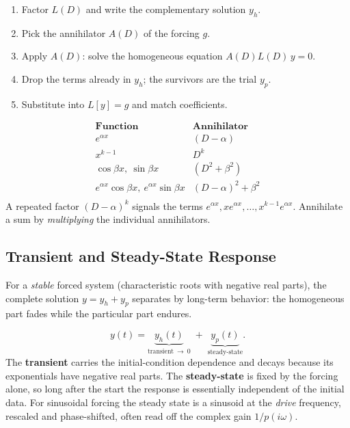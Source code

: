 \begin{methodbox}
\begin{enumerate}[leftmargin=1.6em, itemsep=2pt]
    \item Factor $L(D)$ and write the complementary solution $y_h$.
    \item Pick the annihilator $A(D)$ of the forcing $g$.
    \item Apply $A(D)$: solve the homogeneous equation $A(D)L(D)\,y = 0$.
    \item Drop the terms already in $y_h$; the survivors are the trial $y_p$.
    \item Substitute into $L[y]=g$ and match coefficients.
\end{enumerate}
\end{methodbox}

\begin{formulabox}
\[
\begin{array}{l|l}
\textbf{Function} & \textbf{Annihilator} \\ \hline
e^{\alpha x} & (D-\alpha) \\
x^{k-1} & D^{k} \\
\cos\beta x,\ \sin\beta x & (D^2 + \beta^2) \\
e^{\alpha x}\cos\beta x,\ e^{\alpha x}\sin\beta x & (D-\alpha)^2 + \beta^2 \\
\end{array}
\]
A repeated factor $(D-\alpha)^k$ signals the terms
$e^{\alpha x}, x e^{\alpha x}, \ldots, x^{k-1}e^{\alpha x}$. Annihilate a sum by
\emph{multiplying} the individual annihilators.
\end{formulabox}

\subsection{Transient and Steady-State Response}

For a \emph{stable} forced system (characteristic roots with negative real
parts), the complete solution $y = y_h + y_p$ separates by long-term behavior: the
homogeneous part fades while the particular part endures.

\begin{formulabox}
\[ y(t) = \underbrace{y_h(t)}_{\text{transient}\ \to\ 0} \;+\; \underbrace{y_p(t)}_{\text{steady-state}}. \]
The \textbf{transient} carries the initial-condition dependence and decays because
its exponentials have negative real parts. The \textbf{steady-state} is fixed by
the forcing alone, so long after the start the response is essentially independent
of the initial data. For sinusoidal forcing the steady state is a sinusoid at the
\emph{drive} frequency, rescaled and phase-shifted, often read off the complex
gain $1/p(i\omega)$.
\end{formulabox}

